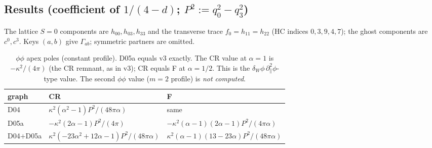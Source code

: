 \documentclass[11pt]{article}
\theoremstyle{definition}
\newcommand{\ka}{\kappa}
\begin{document}
\subsection{Results (coefficient of $1/(4-d)$; $P^2:=q_0^2-q_3^2$)}
The lattice $S=0$ components are $h_{00},h_{03},h_{33}$ and the transverse trace $f_0=h_{11}=h_{22}$ (HC indices $0,3,9,4,7$); the ghost components are $c^0,c^3$. Keys $(a,b)$ give $\Gamma_{ab}$; symmetric partners are omitted.

\begin{table}[h]\centering\small
\begin{tabular}{lll}\toprule
graph & CR & F\\\midrule
D04 & $\ka^2(\alpha^2-1)P^2/(48\pi\alpha)$ & same\\
D05a & $-\ka^2(2\alpha-1)P^2/(4\pi)$ & $-\ka^2(\alpha-1)(2\alpha-1)P^2/(4\pi\alpha)$\\
D04$+$D05a & $\ka^2(-23\alpha^2+12\alpha-1)P^2/(48\pi\alpha)$ & $\ka^2(\alpha-1)(13-23\alpha)P^2/(48\pi\alpha)$\\\bottomrule
\end{tabular}
\caption{$\phi\phi$ apex poles (constant profile). D05a equals v3 exactly. The CR value at $\alpha=1$ is $-\ka^2/(4\pi)$ (the CR remnant, as in v3); CR equals F at $\alpha=1/2$. This is the $\delta_W\phi\,\partial_\parallel^2\phi$-type value. The second $\phi\phi$ value ($m=2$ profile) is \emph{not computed}.}\label{tab:phi}
\end{table}
\end{document}
